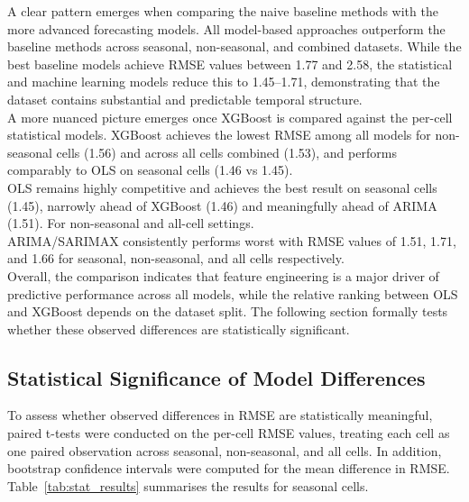 A clear pattern emerges when comparing the naive baseline methods with the more advanced forecasting models. All model-based approaches outperform the baseline methods across seasonal, non-seasonal, and combined datasets. While the best baseline models achieve RMSE values between 1.77 and 2.58, the statistical and machine learning models reduce this to 1.45–1.71, demonstrating that the dataset contains substantial and predictable temporal structure. \\

A more nuanced picture emerges once XGBoost is compared against the per-cell statistical models. XGBoost achieves the lowest RMSE among all models for non-seasonal cells (1.56) and across all cells combined (1.53), and performs comparably to OLS on seasonal cells (1.46 vs 1.45). \\

 OLS remains highly competitive and achieves the best result on seasonal cells (1.45), narrowly ahead of XGBoost (1.46) and meaningfully ahead of ARIMA (1.51). For non-seasonal and all-cell settings. \\

ARIMA/SARIMAX consistently performs worst with RMSE values of 1.51, 1.71, and 1.66 for seasonal, non-seasonal, and all cells respectively. \\

Overall, the comparison indicates that feature engineering is a major driver of predictive performance across all models, while the relative ranking between OLS and XGBoost depends on the dataset split. The following section formally tests whether these observed differences are statistically significant. \\

\subsection{Statistical Significance of Model Differences}

To assess whether observed differences in RMSE are statistically meaningful, paired t-tests were conducted on the per-cell RMSE values, treating each cell as one paired observation across seasonal, non-seasonal, and all cells. In addition, bootstrap confidence intervals were computed for the mean difference in RMSE. \\
Table~\ref{tab:stat_results} summarises the results for seasonal cells.

